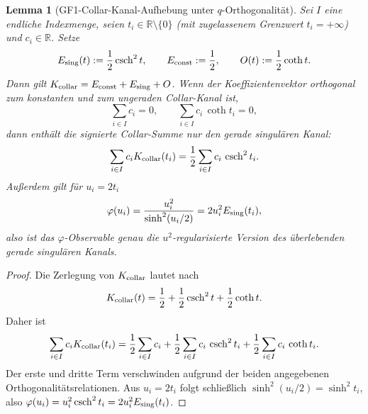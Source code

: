 \documentclass[11pt,a4paper]{article}
\newtheorem{lemma}[lemma]{Lemma}
\theoremstyle{remark}
\theoremstyle{plain}
\begin{document}
\begin{lemma}[GF1-Collar-Kanal-Aufhebung unter \(q\)-Orthogonalität]
\label{lem:gf1-q-orthogonality-annihilation}
Sei \(I\) eine endliche Indexmenge, seien
\(t_i\in\mathbb{R}\setminus\{0\}\) (mit zugelassenem Grenzwert
\(t_i=+\infty\)) und \(c_i\in\mathbb{R}\). Setze
\[
  E_{\rm sing}(t):=\frac12\operatorname{csch}^2t,
  \qquad
  E_{\rm const}:=\frac12,
  \qquad
  O(t):=\frac12\coth t .
\]
Dann gilt \(K_{\rm collar}=E_{\rm const}+E_{\rm sing}+O\). Wenn der
Koeffizientenvektor orthogonal zum konstanten und zum ungeraden
Collar-Kanal ist,
\[
  \sum_{i\in I}c_i=0,
  \qquad
  \sum_{i\in I}c_i\,\coth t_i=0,
\]
dann enthält die signierte Collar-Summe nur den gerade singulären Kanal:
\[
  \sum_{i\in I}c_i K_{\rm collar}(t_i)
  =\frac12\sum_{i\in I}c_i\,\operatorname{csch}^2t_i .
\]
Außerdem gilt für \(u_i=2t_i\)
\[
  \varphi(u_i)
  =\frac{u_i^2}{\sinh^2(u_i/2)}
  =2u_i^2 E_{\rm sing}(t_i),
\]
also ist das \(\varphi\)-Observable genau die \(u^2\)-regularisierte
Version des überlebenden gerade singulären Kanals.
\end{lemma}

\begin{proof}
Die Zerlegung von \(K_{\rm collar}\) lautet nach
\[
  K_{\rm collar}(t)
  =\frac12+\frac12\operatorname{csch}^2t+\frac12\coth t .
\]
Daher ist
\[
  \sum_{i\in I}c_iK_{\rm collar}(t_i)
  =
  \frac12\sum_{i\in I}c_i
  +\frac12\sum_{i\in I}c_i\,\operatorname{csch}^2t_i
  +\frac12\sum_{i\in I}c_i\,\coth t_i .
\]
Der erste und dritte Term verschwinden aufgrund der beiden angegebenen
Orthogonalitätsrelationen. Aus \(u_i=2t_i\) folgt schließlich
\(\sinh^2(u_i/2)=\sinh^2t_i\), also
\(\varphi(u_i)=u_i^2\operatorname{csch}^2t_i
=2u_i^2E_{\rm sing}(t_i)\).
\end{proof}
\end{document}
